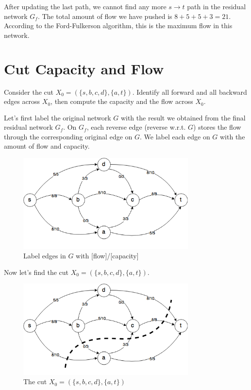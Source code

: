 \documentclass{article}
\begin{document}
After updating the last path, we cannot find any more $s \rightarrow t$
path in the residual network $G_f$. The total amount of flow we have pushed
is $8 + 5 + 5 + 3 = 21$. According to the Ford-Fulkerson algorithm, this
is the maximum flow in this network.

\section{Cut Capacity and Flow}
Consider the cut $X_0 = (\{s,b,c,d\}, \{a,t\})$. Identify all forward and
all backward edges across $X_0$, then compute the capacity and the flow
across $X_0$.

Let's first label the original network $G$ with the result we obtained from
the final residual network $G_f$. 
On $G_f$, each reverse edge (reverse w.r.t. $G$) 
stores the flow through the corresponding original edge on $G$.
We label each edge on $G$ with the amount of flow and capacity.

\begin{figure}[H]
\centering
\includegraphics[width=0.8\textwidth]{g_1.png}
\caption{Label edges in $G$ with [flow]/[capacity]}
\end{figure}

Now let's find the cut $X_0 = (\{s,b,c,d\}, \{a,t\})$.

\begin{figure}[H]
\centering
\includegraphics[width=0.8\textwidth]{g_2.png}
\caption{The cut $X_0 = (\{s,b,c,d\}, \{a,t\})$}
\end{figure}
\end{document}
